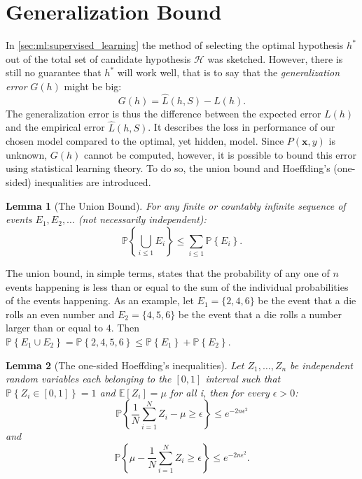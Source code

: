 \documentclass[a4paper, twoside, nobib]{tufte-book}
\newtheorem{lemma}{Lemma}
\renewcommand{\vec}[1]{\mathbf{#1}}
\begin{document}
\section{Generalization Bound}
\label{sec:generalization_bound}
In \autoref{sec:ml:supervised_learning} the method of selecting the optimal hypothesis $h^*$ out of the total set of candidate hypothesis $\mathcal{H}$ was sketched. However, there is still no guarantee that $h^*$ will work well, that is to say that the \emph{generalization error} $G(h)$ might be big:
\begin{equation}
  G(h) = \hat{L}(h, S) - L(h).
\end{equation}
The generalization error is thus the difference between the expected error $L(h)$ and the empirical error $\hat{L}(h, S)$. It describes the loss in performance of our chosen model compared to the optimal, yet hidden, model. Since $P(\vec{x}, y)$ is unknown, $G(h)$ cannot be computed, however, it is possible to bound this error using statistical learning theory. To do so, the union bound and Hoeffding's (one-sided) inequalities are introduced. 
\begin{lemma}[The Union Bound]
  For any finite or countably infinite sequence of events $E_1, E_2, \dots$ (not necessarily independent): 
  \begin{equation}
    \mathbb{P} \left\{\bigcup_{i \leq 1} E_i \right\} \leq \sum_{i \leq 1} \mathbb{P} \left\{E_i \right \}. 
  \end{equation}
\end{lemma}
The union bound, in simple terms, states that the probability of any one of $n$ events happening is less than or equal to the sum of the individual probabilities of the events happening. As an example, let $E_1=\{2, 4, 6\}$ be the event that a die rolls an even number and $E_2=\{4, 5, 6\}$ be the event that a die rolls a number larger than or equal to $4$. Then $\mathbb{P} \left\{E_1 \cup E_2 \right\} = \mathbb{P} \left\{ 2, 4, 5, 6 \right\} \leq \mathbb{P} \left\{E_1 \right \} + \mathbb{P} \left\{E_2 \right \} $. 
\begin{lemma}[The one-sided Hoeffding's inequalities]
  Let $Z_1, \dots, Z_n$ be independent random variables each belonging to the $[0, 1]$ interval such that $\mathbb{P}\left\{Z_i \in [0, 1] \right\} = 1$ and $\mathbb{E}[Z_i] = \mu$ for all i, then for every $\epsilon > 0$:
  \begin{equation}
    \mathbb{P} \left\{  \frac{1}{N}\sum_{i=1}^N Z_i - \mu \geq \epsilon \right\} \leq e^{-2n\epsilon^2} 
    \label{eq:hoeffding_onesided_a}
  \end{equation}
  and
  \begin{equation}
    \mathbb{P} \left\{ \mu - \frac{1}{N}\sum_{i=1}^N Z_i  \geq \epsilon \right\} \leq e^{-2n\epsilon^2}.
    \label{eq:hoeffding_onesided_b}
  \end{equation}
\end{lemma}
\end{document}
